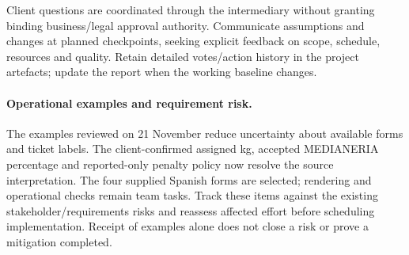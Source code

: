 Client questions are coordinated through the intermediary without granting binding
business/legal approval authority. Communicate assumptions and changes at planned
checkpoints, seeking explicit feedback on scope, schedule, resources and quality. Retain detailed votes/action history in the
project artefacts; update the report when the working baseline changes.

\paragraph{Operational examples and requirement risk.}
The examples reviewed on 21 November reduce uncertainty about available forms and
ticket labels. The client-confirmed assigned kg, accepted MEDIANERIA percentage and reported-only penalty policy now resolve the source interpretation. The four supplied Spanish forms are selected; rendering and operational checks remain team tasks. Track these
items against the existing stakeholder/requirements risks and reassess affected
effort before scheduling implementation. Receipt of examples alone does not close
a risk or prove a mitigation completed.



